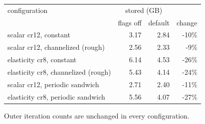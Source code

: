 {\small
\begin{tabular}{lrrr}
\toprule
configuration & \multicolumn{2}{c}{stored (GB)} & \\
 & flags off & default & change \\
\midrule
scalar cr12, constant & 3.17 & 2.84 & -10\% \\
scalar cr12, channelized (rough) & 2.56 & 2.33 & -9\% \\
elasticity cr8, constant & 6.14 & 4.53 & -26\% \\
elasticity cr8, channelized (rough) & 5.43 & 4.14 & -24\% \\
scalar cr12, periodic sandwich & 2.71 & 2.40 & -11\% \\
elasticity cr8, periodic sandwich & 5.56 & 4.07 & -27\% \\
\bottomrule
\end{tabular}
\par\smallskip
{\footnotesize Outer iteration counts are unchanged in every configuration.}
}

